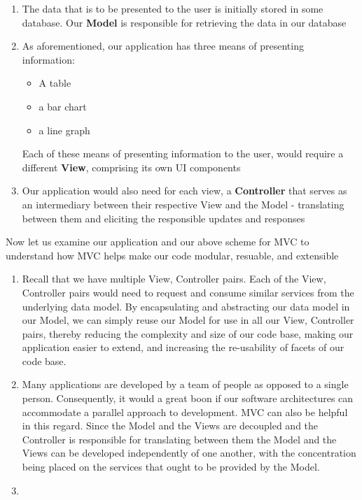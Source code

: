 \begin{enumerate}
\item The data that is to be presented to the user is initially stored in some database. Our \textbf{Model} is responsible for retrieving the data in our database

\item As aforementioned, our application has three means of presenting information:
    \begin{itemize}
    \item A table
    \item a bar chart
    \item a line graph
    \end{itemize}
    Each of these means of presenting information to the user, would require a different \textbf{View}, comprising  its own UI components
    
    
\item Our application would also need for each view, a \textbf{Controller} that serves as an intermediary between their respective View and the Model - translating between them and eliciting the responsible updates and responses
\end{enumerate}


Now let us examine our application and our above scheme for MVC to understand how MVC helps make our code modular, resuable, and extensible


\begin{enumerate}
\item Recall that we have multiple View, Controller pairs. Each of the View, Controller pairs would need to request and consume similar services from the underlying data model. By encapsulating and abstracting our data model in our Model, we can simply reuse our Model for use in all our View, Controller pairs, thereby reducing the complexity and size of our code base, making our application easier to extend, and increasing the re-usability of facets of our code base.

\item Many applications are developed by a team of people as opposed to a single person. Consequently, it would a great boon if our software architectures can accommodate a parallel approach to development. MVC can also be helpful in this regard. Since the Model and the Views are decoupled and the Controller is responsible for translating between them the Model and the Views can be developed independently of one another, with the concentration being placed on the services that ought to be provided by the Model.

\item 
\end{enumerate}







